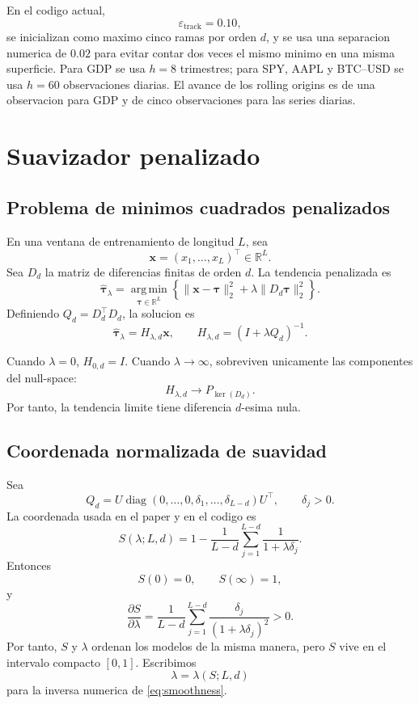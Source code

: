 \documentclass[11pt]{article}
\newcommand{\R}{\mathbb{R}}
\newcommand{\argmin}{\operatorname*{arg\,min}}
\begin{document}
En el codigo actual,
\[
\varepsilon_{\mathrm{track}}=0.10,
\]
se inicializan como maximo cinco ramas por orden \(d\), y se usa una separacion
numerica de \(0.02\) para evitar contar dos veces el mismo minimo en una misma
superficie. Para GDP se usa \(h=8\) trimestres; para SPY, AAPL y BTC--USD se
usa \(h=60\) observaciones diarias. El avance de los rolling origins es de una
observacion para GDP y de cinco observaciones para las series diarias.

\section{Suavizador penalizado}

\subsection{Problema de minimos cuadrados penalizados}

En una ventana de entrenamiento de longitud \(L\), sea
\[
\bm{x}=(x_1,\ldots,x_L)^\top\in\R^L.
\]
Sea \(D_d\) la matriz de diferencias finitas de orden \(d\). La tendencia
penalizada es
\begin{equation}
\widehat{\bm{\tau}}_{\lambda}
=
\argmin_{\bm{\tau}\in\R^L}
\left\{
\|\bm{x}-\bm{\tau}\|_2^2
+
\lambda\|D_d\bm{\tau}\|_2^2
\right\}.
\label{eq:pls}
\end{equation}
Definiendo \(Q_d=D_d^\top D_d\), la solucion es
\begin{equation}
\widehat{\bm{\tau}}_{\lambda}
=
H_{\lambda,d}\bm{x},
\qquad
H_{\lambda,d}=(I+\lambda Q_d)^{-1}.
\label{eq:smoother}
\end{equation}

Cuando \(\lambda=0\), \(H_{0,d}=I\). Cuando \(\lambda\to\infty\), sobreviven
unicamente las componentes del null-space:
\[
H_{\lambda,d}\longrightarrow P_{\ker(D_d)}.
\]
Por tanto, la tendencia limite tiene diferencia \(d\)-esima nula.

\subsection{Coordenada normalizada de suavidad}

Sea
\[
Q_d
=
U\operatorname{diag}
(0,\ldots,0,\delta_1,\ldots,\delta_{L-d})U^\top,
\qquad \delta_j>0.
\]
La coordenada usada en el paper y en el codigo es
\begin{equation}
S(\lambda;L,d)
=
1-
\frac{1}{L-d}
\sum_{j=1}^{L-d}
\frac{1}{1+\lambda\delta_j}.
\label{eq:smoothness}
\end{equation}
Entonces
\[
S(0)=0,
\qquad
S(\infty)=1,
\]
y
\begin{equation}
\frac{\partial S}{\partial\lambda}
=
\frac{1}{L-d}
\sum_{j=1}^{L-d}
\frac{\delta_j}{(1+\lambda\delta_j)^2}
>0.
\label{eq:smonotone}
\end{equation}
Por tanto, \(S\) y \(\lambda\) ordenan los modelos de la misma manera, pero
\(S\) vive en el intervalo compacto \([0,1]\). Escribimos
\[
\lambda=\lambda(S;L,d)
\]
para la inversa numerica de \eqref{eq:smoothness}.
\end{document}
